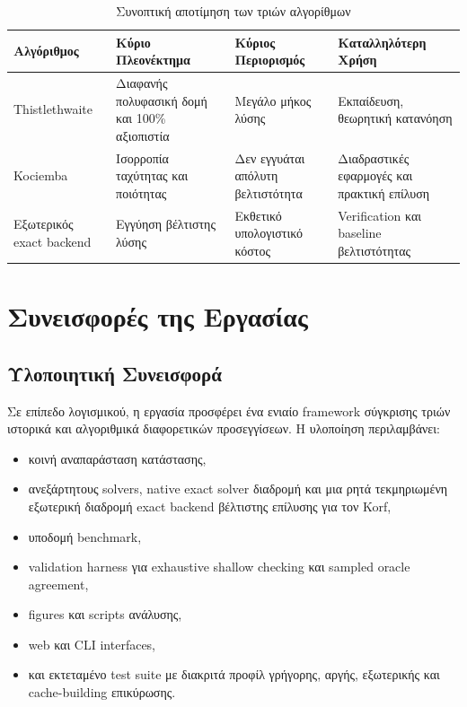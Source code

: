 \begin{table}[htbp]
\centering
\caption{Συνοπτική αποτίμηση των τριών αλγορίθμων}
\label{tab:conclusions_summary}
\begin{tabularx}{\textwidth}{>{\RaggedRight\arraybackslash}p{2.5cm} >{\RaggedRight\arraybackslash}p{2.6cm} >{\RaggedRight\arraybackslash}p{2.8cm} Y}
\toprule
\textbf{Αλγόριθμος} & \textbf{Κύριο Πλεονέκτημα} & \textbf{Κύριος Περιορισμός} & \textbf{Καταλληλότερη Χρήση} \\
\midrule
Thistlethwaite & Διαφανής πολυφασική δομή και 100\% αξιοπιστία & Μεγάλο μήκος λύσης & Εκπαίδευση, θεωρητική κατανόηση \\
Kociemba & Ισορροπία ταχύτητας και ποιότητας & Δεν εγγυάται απόλυτη βελτιστότητα & Διαδραστικές εφαρμογές και πρακτική επίλυση \\
Εξωτερικός exact backend & Εγγύηση βέλτιστης λύσης & Εκθετικό υπολογιστικό κόστος & Verification και baseline βελτιστότητας \\
\bottomrule
\end{tabularx}
\end{table}

\section{Συνεισφορές της Εργασίας}

\subsection{Υλοποιητική Συνεισφορά}

Σε επίπεδο λογισμικού, η εργασία προσφέρει ένα ενιαίο framework σύγκρισης τριών ιστορικά και αλγοριθμικά διαφορετικών προσεγγίσεων. Η υλοποίηση περιλαμβάνει:
\begin{itemize}
    \item κοινή αναπαράσταση κατάστασης,
    \item ανεξάρτητους solvers, native exact solver διαδρομή και μια ρητά τεκμηριωμένη εξωτερική διαδρομή exact backend βέλτιστης επίλυσης για τον Korf,
    \item υποδομή benchmark,
    \item validation harness για exhaustive shallow checking και sampled oracle agreement,
    \item figures και scripts ανάλυσης,
    \item web και CLI interfaces,
    \item και εκτεταμένο test suite με διακριτά προφίλ γρήγορης, αργής, εξωτερικής και cache-building επικύρωσης.
\end{itemize}


